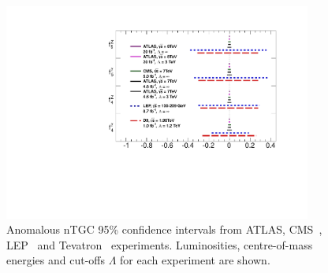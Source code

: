  \begin{figure}[htbp]
 \begin{center}
  \includegraphics[width=0.9\textwidth]{SummaryPlot}\hfill
  \caption{\small 
Anomalous nTGC 95\% confidence intervals from ATLAS, CMS~\cite{CMS:2012rg}, LEP~\cite{bib:LEPEW2006} and Tevatron~\cite{bib:D0_ZZ1}
experiments. Luminosities, centre-of-mass energies and cut-offs $\Lambda$ for each experiment are shown.
   }
\label{fig:TGC-SummaryPlot}
 \end{center}
 \end{figure}
